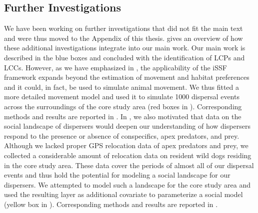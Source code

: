 \documentclass[abstract=on,10pt,a4paper,bibliography=totocnumbered]{scrartcl}
\begin{document}
\subsection{Further Investigations}
We have been working on further investigations that did not fit the main text
and were thus moved to the Appendix of this thesis. 
gives an overview of how these additional investigations integrate into our main
work. Our main work is described in the blue boxes and concluded with the
identification of LCPs and LCCs. However, as we have emphasized in
, the applicability of the iSSF framework expands beyond the
estimation of movement and habitat preferences and it could, in fact, be used to
simulate animal movement. We thus fitted a more detailed movement model and used
it to simulate 1000 dispersal events across the surroundings of the core study
area (red boxes in ). Corresponding methods and results
are reported in . In , we
also motivated that data on the social landscape of dispersers would deepen our
understanding of how dispersers respond to the presence or absence of
conspecifics, apex predators, and prey. Although we lacked proper GPS relocation
data of apex predators and prey, we collected a considerable amount of
relocation data on resident wild dogs residing in the core study area. These
data cover the periods of almost all of our dispersal events and thus hold the
potential for modeling a social landscape for our dispersers. We attempted to
model such a landscape for the core study area and used the resulting layer as
additional covariate to parameterize a social model (yellow box in
). Corresponding methods and results are reported in
.
\end{document}
